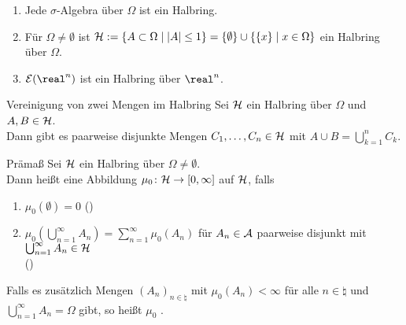\begin{Bsp}
    \begin{enumerate}
        \item
        Jede $\sigma$-Algebra über $\Omega$ ist ein Halbring.
        
        \item
        Für $\Omega \not= \emptyset$ ist $\mathcal{H} := \{A \subset \Omega \;|\; |A| \le 1\} =
        \{\emptyset\} \cup \{\{x\} \;|\; x \in \Omega\}$ ein Halbring über $\Omega$.
        
        \item
        $\E(\real^n)$ ist ein Halbring über $\real^n$.
    \end{enumerate}
\end{Bsp}

\begin{Satz}{Vereinigung von zwei Mengen im Halbring}
    Sei $\mathcal{H}$ ein Halbring über $\Omega$ und $A, B \in \mathcal{H}$.\\
    Dann gibt es paarweise disjunkte Mengen $C_1, \dotsc, C_n \in \mathcal{H}$ mit
    $A \cup B = \bigcup_{k=1}^n C_k$.
\end{Satz}

\linie

\begin{Def}{Prämaß}
    Sei $\mathcal{H}$ ein Halbring über $\Omega \not= \emptyset$.\\
    Dann heißt eine Abbildung $\mu_0\colon \mathcal{H} \rightarrow [0, \infty]$ 
    auf $\mathcal{H}$, falls
    \begin{enumerate}
        \item
        $\mu_0(\emptyset) = 0$ ()
        
        \item
        $\mu_0(\bigcup_{n=1}^\infty A_n) = \sum_{n=1}^\infty \mu_0(A_n)$ für
        $A_n \in \mathcal{A}$ paarweise disjunkt mit $\bigcup_{n=1}^\infty A_n \in \mathcal{H}$\\
        ()
    \end{enumerate}
    Falls es zusätzlich Mengen $(A_n)_{n \in \natural}$ mit $\mu_0(A_n) < \infty$ für alle
    $n \in \natural$ und $\bigcup_{n=1}^\infty A_n = \Omega$ gibt, so heißt $\mu_0$
    .
\end{Def}

\linie
\pagebreak

